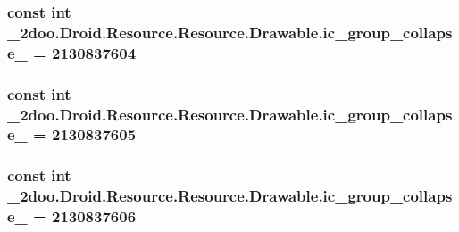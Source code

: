 \hypertarget{class__2doo_1_1_droid_1_1_resource_1_1_drawable_e3f4578b6801001be5d8007ae14fda50}{
\subsubsection[{ic\_\-group\_\-collapse\_\-05}]{\setlength{\rightskip}{0pt plus 5cm}const int \_\-2doo.Droid.Resource.Resource.Drawable.ic\_\-group\_\-collapse\_ = 2130837604}}
\label{class__2doo_1_1_droid_1_1_resource_1_1_drawable_e3f4578b6801001be5d8007ae14fda50}


\hypertarget{class__2doo_1_1_droid_1_1_resource_1_1_drawable_c6dcede4cffd11e0b510cc1095d30776}{
\subsubsection[{ic\_\-group\_\-collapse\_\-06}]{\setlength{\rightskip}{0pt plus 5cm}const int \_\-2doo.Droid.Resource.Resource.Drawable.ic\_\-group\_\-collapse\_ = 2130837605}}
\label{class__2doo_1_1_droid_1_1_resource_1_1_drawable_c6dcede4cffd11e0b510cc1095d30776}


\hypertarget{class__2doo_1_1_droid_1_1_resource_1_1_drawable_4d03cb7acf646a52d9601dc16f43d4de}{
\subsubsection[{ic\_\-group\_\-collapse\_\-07}]{\setlength{\rightskip}{0pt plus 5cm}const int \_\-2doo.Droid.Resource.Resource.Drawable.ic\_\-group\_\-collapse\_ = 2130837606}}
\label{class__2doo_1_1_droid_1_1_resource_1_1_drawable_4d03cb7acf646a52d9601dc16f43d4de}


